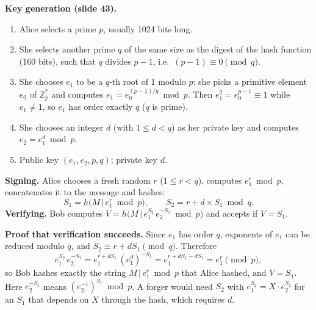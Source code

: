 \textbf{Key generation (slide 43).}
\begin{enumerate}[leftmargin=1.6em]
  \item Alice selects a prime $p$, usually 1024 bits long.
  \item She selects another prime $q$ of the same size as the digest of the hash function (160 bits), such that $q$ divides $p - 1$, i.e.\ $(p - 1) \equiv 0 \pmod q$.
  \item She chooses $e_1$ to be a $q$-th root of 1 modulo $p$: she picks a primitive element $e_0$ of $\mathbb{Z}_p^*$ and computes $e_1 = e_0^{(p-1)/q} \bmod p$. Then $e_1^q = e_0^{p-1} \equiv 1$ while $e_1 \ne 1$, so $e_1$ has order exactly $q$ ($q$ is prime).
  \item She chooses an integer $d$ (with $1 \le d < q$) as her private key and computes $e_2 = e_1^d \bmod p$.
  \item Public key $(e_1, e_2, p, q)$; private key $d$.
\end{enumerate}

\textbf{Signing.} Alice chooses a fresh random $r$ ($1 \le r < q$), computes $e_1^r \bmod p$, concatenates it to the message and hashes:
\[
S_1 = h\big(M \,|\, e_1^r \bmod p\big), \qquad S_2 = r + d \times S_1 \bmod q .
\]
\textbf{Verifying.} Bob computes $V = h\big(M \,|\, e_1^{S_2}\, e_2^{-S_1} \bmod p\big)$ and accepts if $V = S_1$.

\textbf{Proof that verification succeeds.} Since $e_1$ has order $q$, exponents of $e_1$ can be reduced modulo $q$, and $S_2 \equiv r + d S_1 \pmod q$. Therefore
\[
e_1^{S_2}\, e_2^{-S_1} = e_1^{r + d S_1}\,(e_1^{d})^{-S_1} = e_1^{r + dS_1 - dS_1} = e_1^{r} \pmod p ,
\]
so Bob hashes exactly the string $M \,|\, e_1^r \bmod p$ that Alice hashed, and $V = S_1$. Here $e_2^{-S_1}$ means $(e_2^{-1})^{S_1} \bmod p$. A forger would need $S_2$ with $e_1^{S_2} = X \cdot e_2^{S_1}$ for an $S_1$ that depends on $X$ through the hash, which requires $d$.

